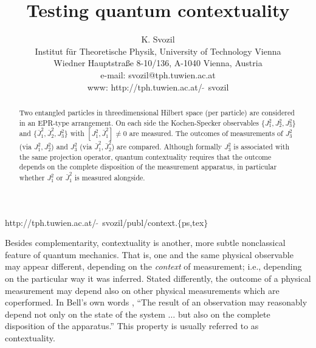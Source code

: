 

\def\frak{\cal }
\def\Bbb{\bf }

\title{Testing quantum contextuality}
\author{K. Svozil\\
 {\small Institut f\"ur Theoretische Physik,}
  {\small University of Technology Vienna }     \\
  {\small Wiedner Hauptstra\ss e 8-10/136,}
  {\small A-1040 Vienna, Austria   }            \\
  {\small e-mail: svozil@tph.tuwien.ac.at}\\
  {\small www: http://tph.tuwien.ac.at/$\widetilde{\;\;}\,$svozil}}
\date{ }
\maketitle

\begin{flushright}
{\scriptsize http://tph.tuwien.ac.at/$\widetilde{\;\;}\,$svozil/publ/context.$\{$ps,tex$\}$}
\end{flushright}

\begin{abstract}
Two entangled particles in threedimensional
Hilbert space (per particle) are considered in an EPR-type arrangement. On each side
the  Kochen-Specker observables $\{J_1^2,J_2^2,J_3^2\}$ and $\{\bar J_1^2,
\bar J_2^2,J_3^2\}$ with $[J_1^2,\bar J_1^2]\neq
0$ are measured.
The outcomes of measurements of  $J_3^2$ (via $J_1^2,J_2^2$) and $J_3^2$
(via $\bar J_1^2,\bar J_2^2$) are compared.
Although formally $J_3^2$ is associated with the same projection
operator,
quantum contextuality requires that the outcome
depends on the complete disposition of the measurement apparatus,
in particular whether $J_1^2$  or $\bar J_1^2$ is measured alongside.
\end{abstract}



Besides complementarity, contextuality
\cite{bell-66,hey-red,redhead,peres,mermin-93}
is another, more subtle nonclassical feature of quantum mechanics.
That is, one and the same physical observable may
appear different, depending on the {\em context} of measurement;
i.e., depending on the particular way it was inferred. Stated
differently, the outcome of a physical measurement
may depend also on other physical measurements
which are coperformed.
In Bell's own words \cite[section 5]{bell-66}, ``The result of an
observation may
reasonably depend not only on the state of the system $\ldots $ but also
on the complete disposition of the apparatus.'' This property is usually
referred to as contextuality.


